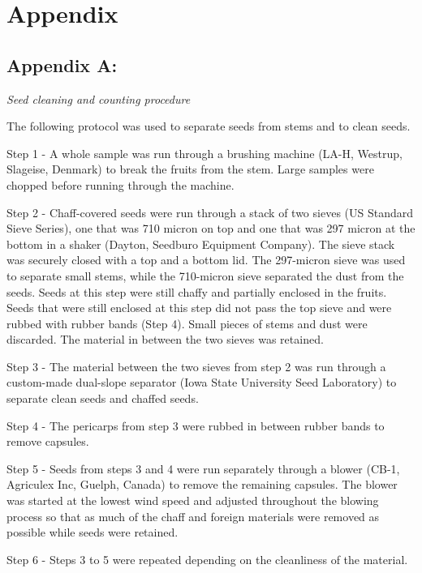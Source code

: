 \documentclass[
]{article}
\begin{document}
\break 
\hypertarget{appendix}{%
\section*{Appendix}\label{appendix}}

\hypertarget{appendix-a}{%
\subsection{Appendix A:}\label{appendix-a}}

\emph{Seed cleaning and counting procedure}

The following protocol was used to separate seeds from stems and to clean seeds.

Step 1 - A whole sample was run through a brushing machine (LA-H, Westrup, Slageise, Denmark) to break the fruits from the stem. Large samples were chopped before running through the machine.

Step 2 - Chaff-covered seeds were run through a stack of two sieves (US Standard Sieve Series), one that was 710 micron on top and one that was 297 micron at the bottom in a shaker (Dayton, Seedburo Equipment Company). The sieve stack was securely closed with a top and a bottom lid. The 297-micron sieve was used to separate small stems, while the 710-micron sieve separated the dust from the seeds. Seeds at this step were still chaffy and partially enclosed in the fruits. Seeds that were still enclosed at this step did not pass the top sieve and were rubbed with rubber bands (Step 4). Small pieces of stems and dust were discarded. The material in between the two sieves was retained.

Step 3 - The material between the two sieves from step 2 was run through a custom-made dual-slope separator (Iowa State University Seed Laboratory) to separate clean seeds and chaffed seeds.

Step 4 - The pericarps from step 3 were rubbed in between rubber bands to remove capsules.

Step 5 - Seeds from steps 3 and 4 were run separately through a blower (CB-1, Agriculex Inc, Guelph, Canada) to remove the remaining capsules. The blower was started at the lowest wind speed and adjusted throughout the blowing process so that as much of the chaff and foreign materials were removed as possible while seeds were retained.

Step 6 - Steps 3 to 5 were repeated depending on the cleanliness of the material.
\end{document}
